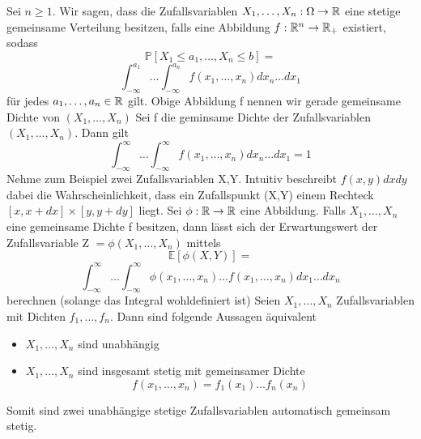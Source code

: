 \Def[5.7] \newline
Sei \( n \geq 1\). Wir sagen, dass die Zufallsvariablen \(X_1 , \dots , X_n : \Omega \rightarrow \mathbb{R} \) eine stetige gemeinsame Verteilung besitzen, falls eine Abbildung \( f: \mathbb{R}^n \rightarrow \mathbb{R}_+ \) existiert, sodass \[ \mathbb{P}[X_1 \leq a_1, \dots , X_n \leq b] = \] \[\int_{-\infty}^{a_1} \dots \int_{-\infty}^{a_n} f(x_1, \dots , x_n) dx_n \dots dx_1\]
für jedes  \( a_1 , \dots , a_n \in \mathbb{R} \) gilt. Obige Abbildung f nennen wir gerade gemeinsame Dichte von \((X_1, \dots , X_n)\)
\Satz[5.9] \newline
Sei f die geminsame Dichte der Zufallsvariablen \((X_1, \dots , X_n)\). Dann gilt \[ \int_{-\infty}^\infty \dots \int_{-\infty}^\infty f(x_1, \dots , x_n )dx_n \dots dx_1 = 1\]
\Bem[5.9a] \newline
Nehme zum Beispiel zwei Zufallsvariablen X,Y. Intuitiv beschreibt \(f(x,y)dxdy\) dabei die Wahrscheinlichkeit, dass ein Zufallspunkt (X,Y) einem Rechteck \([x, x + dx] \times [y,y + dy]\) liegt.
\Satz[5.10] \newline
Sei \( \phi: \mathbb{R} \rightarrow \mathbb{R} \) eine Abbildung. Falls \( X_1, \dots , X_n\) eine gemeinsame Dichte f besitzen, dann lässt sich der Erwartungswert der Zufallsvariable Z \( = \phi (X_1, \dots , X_n )\) mittels \[ \mathbb{E}[\phi(X,Y)] = \] \[\int_{-\infty}^\infty \dots \int_{-\infty}^\infty \phi(x_1 , \dots , x_n) \dots f(x_1, \dots , x_n) dx_1 \dots dx_n\]
berechnen (solange das Integral wohldefiniert ist)
\Theo[5.11] \newline
Seien \(X_1, \dots , X_n \) Zufallsvariablen mit Dichten \(f_1, \dots , f_n\). Dann sind folgende Aussagen äquivalent
\begin{itemize}
    \item \(X_1, \dots , X_n \) sind unabhängig
    \item \(X_1, \dots , X_n \) sind insgesamt stetig mit gemeinsamer Dichte \[f(x_1, \dots , x_n) = f_1(x_1) \dots f_n(x_n)\]
\end{itemize}
\Bem[5.12] \newline
Somit sind zwei unabhängige stetige Zufallsvariablen automatisch gemeinsam stetig.



